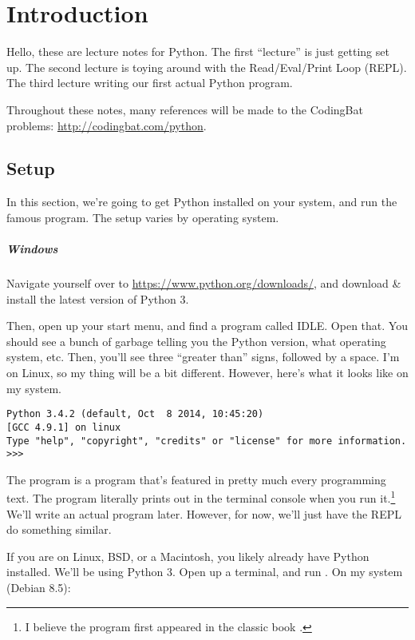 \chapter{Introduction}

Hello, these are lecture notes for Python. The first ``lecture'' is
just getting set up. The second lecture is toying around with the
Read/Eval/Print Loop (REPL). The third lecture writing our first
actual Python program.

Throughout these notes, many references will be made to the CodingBat
problems: \url{http://codingbat.com/python}.

\section{Setup}

In this section, we're going to get Python installed on your system,
and run the famous  program. The setup varies by
operating system.

\paragraph{Windows}

Navigate yourself over to \url{https://www.python.org/downloads/}, and
download \& install the latest version of Python 3.

Then, open up your start menu, and find a program called IDLE. Open
that. You should see a bunch of garbage telling you the Python
version, what operating system, etc. Then, you'll see three ``greater
than'' signs, followed by a space. I'm on Linux, so my thing will be a
bit different. However, here's what it looks like on my system.

\begin{lstlisting}
Python 3.4.2 (default, Oct  8 2014, 10:45:20) 
[GCC 4.9.1] on linux
Type "help", "copyright", "credits" or "license" for more information.
>>> 
\end{lstlisting}

The  program is a program that's featured in pretty
much every programming text. The program literally prints out
 in the terminal console when you run
it.\footnote{I believe the program first appeared in the classic book
  .} We'll write an actual program later. However,
for now, we'll just have the REPL do something similar.

If you are on Linux, BSD, or a Macintosh, you likely already have
Python installed. We'll be using Python 3. Open up a terminal, and run
. On my system (Debian 8.5):

